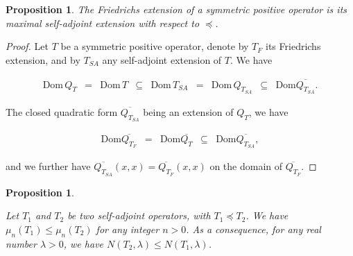 \documentclass{jams-l}
\newtheorem{proposition}[theorem]{Proposition}
\theoremstyle{definition}
\theoremstyle{remark}
\numberwithin{equation}{section}
\begin{document}
        \begin{proposition}
        
            The Friedrichs extension of a symmetric positive operator is its maximal self-adjoint extension with respect to $\preccurlyeq$.
        
        \end{proposition}
        
        \begin{proof}
        
            Let $T$ be a symmetric positive operator, denote by $T_F$ its Friedrichs extension, and by $T_{SA}$ any self-adjoint extension of $T$. We have
            
            \[ \begin{array}{ccccccccc}
                    \mathrm{Dom} \, Q_T & = & \mathrm{Dom} \, T & \subseteq & \mathrm{Dom} \, T_{SA} & = & \mathrm{Dom} \, Q_{T_{SA}} & \subseteq & \mathrm{Dom} \overline{Q_{T_{SA}}}.
                \end{array} \]
            
            \noindent The closed quadratic form $\overline{Q_{T_{SA}}}$ being an extension of $Q_T$, we have
            
            \[ \begin{array}{ccccc}
                    \mathrm{Dom} \overline{Q_{T_F}} & = & \mathrm{Dom} \overline{Q_T} & \subseteq & \mathrm{Dom} \overline{Q_{T_{SA}}},
                \end{array} \]
            
            \noindent and we further have $\overline{Q_{T_{SA}}} \left( x,x \right) = \overline{Q_{T_F}} \left( x,x \right)$ on the domain of $\overline{Q_{T_F}}$.
        
        \end{proof}
        
        \begin{proposition}
        \label{PropSpectralCountingOrderRelation}
        
            Let $T_1$ and $T_2$ be two self-adjoint operators, with $T_1 \preccurlyeq T_2$. We have $\mu_n \left( T_1 \right) \leqslant \mu_n \left( T_2 \right)$ for any integer $n > 0$. As a consequence, for any real number $\lambda > 0$, we have $N \left( T_2, \lambda \right) \leqslant N \left( T_1, \lambda \right)$.
        
        \end{proposition}
        
\end{document}
